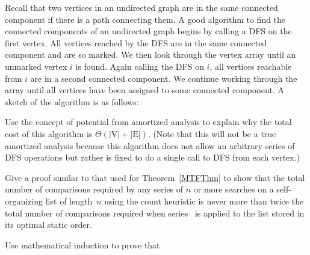 \begin{exercises}
\item
Recall that two vertices in an undirected graph are in the same
connected component if there is a path
connecting them.
A good algorithm to find the connected components of an undirected
graph begins by calling a DFS on the first vertex.
All vertices reached by the DFS are in the same connected component
and are so marked.
We then look through the vertex  array until an unmarked
vertex $i$ is found.
Again calling the DFS on $i$, all vertices reachable from $i$ are in
a second connected component.
We continue working through the  array until all vertices
have been assigned to some connected component.
A sketch of the algorithm is as follows:


Use the concept of potential from amortized analysis to explain why the
total cost of this algorithm is $\Theta(|\mbox{V}| + |\mbox{E}|)$.
(Note that this will not be a true amortized analysis because this
algorithm does not allow an arbitrary series of DFS operations but
rather is fixed to do a single call to DFS from each vertex.)


\item
Give a proof similar to that used for Theorem~\ref{MTFThm} to show
that the total number of comparisons required by any series of
$n$ or more searches  on a self-organizing list of length~$n$
using the count heuristic is never more than twice the total number of
comparisons required when series~ is applied to the list
stored in its optimal static order.

\item
Use mathematical induction to prove that


\end{exercises}
